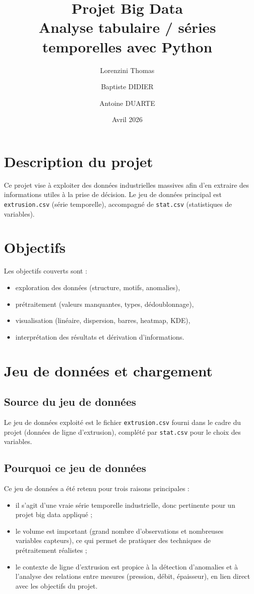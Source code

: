 \documentclass[11pt,a4paper]{article}
\title{Projet Big Data\\Analyse tabulaire / séries temporelles avec Python}
\author{Lorenzini Thomas \and Baptiste DIDIER \and Antoine DUARTE}
\date{Avril 2026}
\begin{document}
\maketitle
\tableofcontents
\newpage

\section{Description du projet}
Ce projet vise à exploiter des données industrielles massives afin d'en extraire des informations utiles à la prise de décision. Le jeu de données principal est \texttt{extrusion.csv} (série temporelle), accompagné de \texttt{stat.csv} (statistiques de variables).

\section{Objectifs}
Les objectifs couverts sont :
\begin{itemize}
  \item exploration des données (structure, motifs, anomalies),
  \item prétraitement (valeurs manquantes, types, dédoublonnage),
  \item visualisation (linéaire, dispersion, barres, heatmap, KDE),
  \item interprétation des résultats et dérivation d'informations.
\end{itemize}

\section{Jeu de données et chargement}
\subsection{Source du jeu de données}
Le jeu de données exploité est le fichier \texttt{extrusion.csv} fourni dans le cadre du projet (données de ligne d'extrusion), complété par \texttt{stat.csv} pour le choix des variables.

\subsection{Pourquoi ce jeu de données}
Ce jeu de données a été retenu pour trois raisons principales :
\begin{itemize}
  \item il s'agit d'une vraie série temporelle industrielle, donc pertinente pour un projet big data appliqué ;
  \item le volume est important (grand nombre d'observations et nombreuses variables capteurs), ce qui permet de pratiquer des techniques de prétraitement réalistes ;
  \item le contexte de ligne d'extrusion est propice à la détection d'anomalies et à l'analyse des relations entre mesures (pression, débit, épaisseur), en lien direct avec les objectifs du projet.
\end{itemize}
\end{document}
